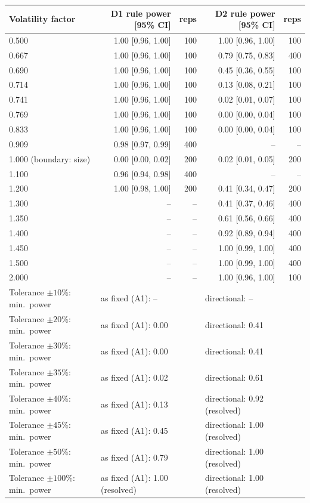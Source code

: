 \begin{tabular}{lrrrr}
\toprule
Volatility factor & D1 rule power [95\% CI] & reps & D2 rule power [95\% CI] & reps \\
\midrule
0.500 & 1.00 [0.96, 1.00] & 100 & 1.00 [0.96, 1.00] & 100 \\
0.667 & 1.00 [0.96, 1.00] & 100 & 0.79 [0.75, 0.83] & 400 \\
0.690 & 1.00 [0.96, 1.00] & 100 & 0.45 [0.36, 0.55] & 100 \\
0.714 & 1.00 [0.96, 1.00] & 100 & 0.13 [0.08, 0.21] & 100 \\
0.741 & 1.00 [0.96, 1.00] & 100 & 0.02 [0.01, 0.07] & 100 \\
0.769 & 1.00 [0.96, 1.00] & 100 & 0.00 [0.00, 0.04] & 100 \\
0.833 & 1.00 [0.96, 1.00] & 100 & 0.00 [0.00, 0.04] & 100 \\
0.909 & 0.98 [0.97, 0.99] & 400 & -- & -- \\
1.000 (boundary: size) & 0.00 [0.00, 0.02] & 200 & 0.02 [0.01, 0.05] & 200 \\
1.100 & 0.96 [0.94, 0.98] & 400 & -- & -- \\
1.200 & 1.00 [0.98, 1.00] & 200 & 0.41 [0.34, 0.47] & 200 \\
1.300 & -- & -- & 0.41 [0.37, 0.46] & 400 \\
1.350 & -- & -- & 0.61 [0.56, 0.66] & 400 \\
1.400 & -- & -- & 0.92 [0.89, 0.94] & 400 \\
1.450 & -- & -- & 1.00 [0.99, 1.00] & 400 \\
1.500 & -- & -- & 1.00 [0.99, 1.00] & 400 \\
2.000 & -- & -- & 1.00 [0.96, 1.00] & 100 \\
\midrule
Tolerance $\pm10\%$: min.\ power & \multicolumn{2}{l}{as fixed (A1): --} & \multicolumn{2}{l}{directional: --} \\
Tolerance $\pm20\%$: min.\ power & \multicolumn{2}{l}{as fixed (A1): 0.00} & \multicolumn{2}{l}{directional: 0.41} \\
Tolerance $\pm30\%$: min.\ power & \multicolumn{2}{l}{as fixed (A1): 0.00} & \multicolumn{2}{l}{directional: 0.41} \\
Tolerance $\pm35\%$: min.\ power & \multicolumn{2}{l}{as fixed (A1): 0.02} & \multicolumn{2}{l}{directional: 0.61} \\
Tolerance $\pm40\%$: min.\ power & \multicolumn{2}{l}{as fixed (A1): 0.13} & \multicolumn{2}{l}{directional: 0.92 (resolved)} \\
Tolerance $\pm45\%$: min.\ power & \multicolumn{2}{l}{as fixed (A1): 0.45} & \multicolumn{2}{l}{directional: 1.00 (resolved)} \\
Tolerance $\pm50\%$: min.\ power & \multicolumn{2}{l}{as fixed (A1): 0.79} & \multicolumn{2}{l}{directional: 1.00 (resolved)} \\
Tolerance $\pm100\%$: min.\ power & \multicolumn{2}{l}{as fixed (A1): 1.00 (resolved)} & \multicolumn{2}{l}{directional: 1.00 (resolved)} \\
\bottomrule
\end{tabular}
